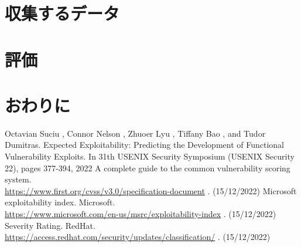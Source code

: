 \documentclass[submit,techreq,noauthor]{eco}	%
\begin{document}
\section{収集するデータ}

\section{評価}

\section{おわりに}


\begin{thebibliography}{99}
   Octavian Suciu , Connor Nelson , Zhuoer Lyu , Tiffany Bao , and Tudor Dumitras.
    \quad Expected Exploitability: Predicting the Development of Functional Vulnerability 
    Exploits. In 31th USENIX Security Symposium (USENIX Security 22), pages 377-394, 2022
    A complete guide to the common vulnerability scoring system.\\
      \url{https://www.first.org/cvss/v3.0/specification-document} . (15/12/2022)
    Microsoft exploitability index. Microsoft.\\
      \url{https://www.microsoft.com/en-us/msrc/exploitability-index} . (15/12/2022)
    Severity Rating. RedHat.\\
      \url{https://access.redhat.com/security/updates/classification/} . (15/12/2022)
\end{thebibliography}
\end{document}
